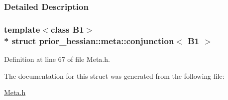 \subsubsection{Detailed Description}
\subsubsection*{template$<$class B1$>$\\*
struct prior\+\_\+hessian\+::meta\+::conjunction$<$ B1 $>$}



Definition at line 67 of file Meta.\+h.



The documentation for this struct was generated from the following file\+:\begin{DoxyCompactItemize}
\item 
\hyperlink{Meta_8h}{Meta.\+h}\end{DoxyCompactItemize}

